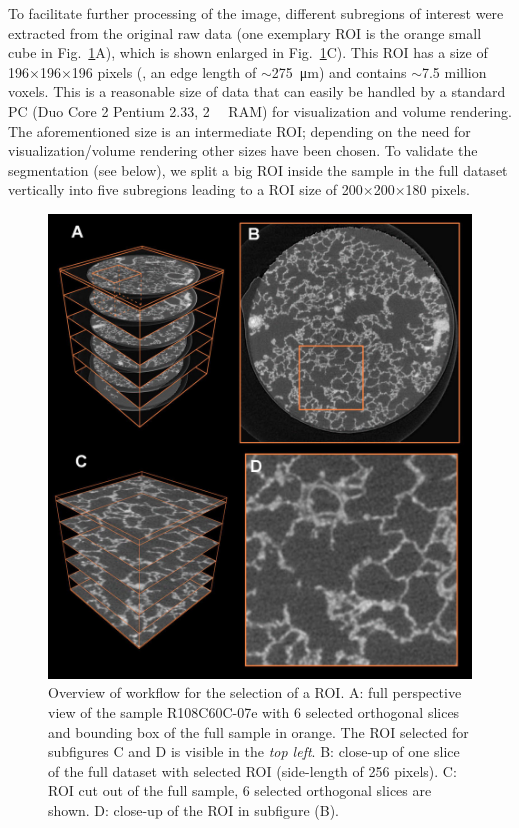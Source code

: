 To facilitate further processing of the image, different subregions of interest were extracted from the original raw data (one exemplary \ac{ROI} is the orange small cube in Fig.~\ref{fig:srxtm}A), which is shown enlarged in Fig.~\ref{fig:srxtm}C). This \ac{ROI} has a size of 196$\times$196$\times$196 pixels (\ie, an edge length of $\sim$\SI{275}{\micro\meter}) and contains $\sim$7.5 million voxels. This is a reasonable size of data that can easily be handled by a standard \acs{PC} (Duo Core 2 Pentium \SI{2.33}{\gigahertz}, \SI{2}{\giga\byte} \acs{RAM}) for visualization and volume rendering. The aforementioned size is an intermediate \ac{ROI}; depending on the need for visualization/volume rendering other sizes have been chosen. To validate the segmentation (see below), we split a big \ac{ROI} inside the sample in the full dataset vertically into five subregions leading to a \ac{ROI} size of 200$\times$200$\times$180 pixels.

\renewcommand{\imsize}{\linewidth}
\begin{figure}[p]
	\centering
	\includegraphics[width=\imsize]{img/Tsuda2008/Tsuda-05}
	\caption[Overview of workflow for the selection of a region of interest]{Overview of workflow for the selection of a \acf{ROI}. A: full perspective view of the sample R108C60C-07e with 6 selected orthogonal slices and
bounding box of the full sample in orange. The \ac{ROI} selected for subfigures C and D is
visible in the \textit{top left}. B: close-up of one slice of the full dataset with selected \ac{ROI} (side-length of 256 pixels). C: \ac{ROI} cut out of the full sample, 6 selected orthogonal slices are shown. D: close-up of the \ac{ROI} in subfigure (B).}
	\label{fig:srxtm}
\end{figure}

